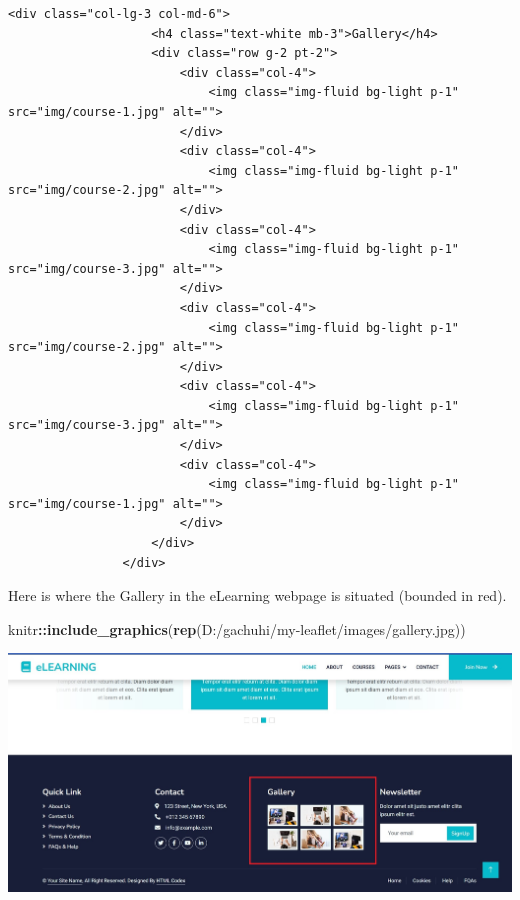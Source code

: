 \documentclass[
]{book}
\newenvironment{Shaded}{\begin{snugshade}}{\end{snugshade}}
\newcommand{\FunctionTok}[1]{\textcolor[rgb]{0.13,0.29,0.53}{\textbf{#1}}}
\newcommand{\NormalTok}[1]{#1}
\newcommand{\SpecialCharTok}[1]{\textcolor[rgb]{0.81,0.36,0.00}{\textbf{#1}}}
\newcommand{\StringTok}[1]{\textcolor[rgb]{0.31,0.60,0.02}{#1}}
\begin{document}
\begin{verbatim}
<div class="col-lg-3 col-md-6">
                    <h4 class="text-white mb-3">Gallery</h4>
                    <div class="row g-2 pt-2">
                        <div class="col-4">
                            <img class="img-fluid bg-light p-1" src="img/course-1.jpg" alt="">
                        </div>
                        <div class="col-4">
                            <img class="img-fluid bg-light p-1" src="img/course-2.jpg" alt="">
                        </div>
                        <div class="col-4">
                            <img class="img-fluid bg-light p-1" src="img/course-3.jpg" alt="">
                        </div>
                        <div class="col-4">
                            <img class="img-fluid bg-light p-1" src="img/course-2.jpg" alt="">
                        </div>
                        <div class="col-4">
                            <img class="img-fluid bg-light p-1" src="img/course-3.jpg" alt="">
                        </div>
                        <div class="col-4">
                            <img class="img-fluid bg-light p-1" src="img/course-1.jpg" alt="">
                        </div>
                    </div>
                </div>
\end{verbatim}

Here is where the Gallery in the eLearning webpage is situated (bounded in red).

\begin{Shaded}
\begin{Highlighting}[]
\NormalTok{knitr}\SpecialCharTok{::}\FunctionTok{include\_graphics}\NormalTok{(}\FunctionTok{rep}\NormalTok{(}\StringTok{\textquotesingle{}D:/gachuhi/my{-}leaflet/images/gallery.jpg\textquotesingle{}}\NormalTok{))}
\end{Highlighting}
\end{Shaded}

\includegraphics{../images/gallery.jpg}
\end{document}
